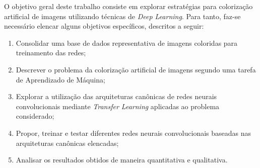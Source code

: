 O objetivo geral deste trabalho consiste em explorar estratégias para colorização artificial de imagens utilizando técnicas de \textit{Deep Learning}. Para tanto, faz-se necessário elencar alguns objetivos específicos, descritos a seguir:

\begin{enumerate}
	\item Consolidar uma base de dados representativa de imagens coloridas para treinamento das redes;
	\item Descrever o problema da colorização artificial de imagens segundo uma tarefa de Aprendizado de Máquina;
	\item Explorar a utilização das arquiteturas canônicas de redes neurais convolucionais mediante \textit{Transfer Learning} aplicadas ao problema  considerado;
	\item Propor, treinar e testar diferentes redes neurais convolucionais baseadas nas arquiteturas canônicas elencadas;
	\item Analisar os resultados obtidos de maneira quantitativa e qualitativa.
\end{enumerate}
